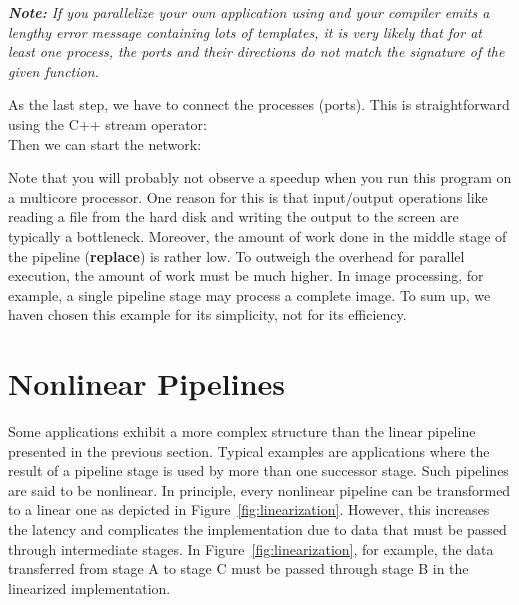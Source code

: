 \emph{\textbf{Note:} If you parallelize your own application using \embb and your compiler emits a lengthy error message containing lots of templates, it is very likely that for at least one process, the ports and their directions do not match the signature of the given function.}

As the last step, we have to connect the processes (ports). This is straightforward using the C++ stream operator:
%
\\
%
Then we can start the network:
%
\\
%

Note that you will probably not observe a speedup when you run this program on a multicore processor. One reason for this is that input$/$output operations like reading a file from the hard disk and writing the output to the screen are typically a bottleneck. Moreover, the amount of work done in the middle stage of the pipeline (\textbf{replace}) is rather low. To outweigh the overhead for parallel execution, the amount of work must be much higher. In image processing, for example, a single pipeline stage may process a complete image. To sum up, we haven chosen this example for its simplicity, not for its efficiency.

\section{Nonlinear Pipelines}

Some applications exhibit a more complex structure than the linear pipeline presented in the previous section. Typical examples are applications where the result of a pipeline stage is used by more than one successor stage. Such pipelines are said to be nonlinear. In principle, every nonlinear pipeline can be transformed to a linear one as depicted in Figure~\ref{fig:linearization}. However, this increases the latency and complicates the implementation due to data that must be passed through intermediate stages. In Figure~\ref{fig:linearization}, for example, the data transferred from stage A to stage C must be passed through stage B in the linearized implementation.

